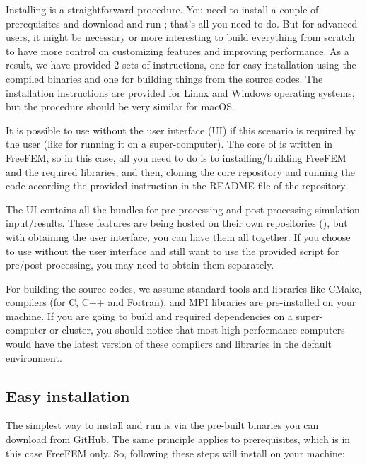 Installing \biodeg{} is a straightforward procedure. You need to install a couple of prerequisites and download and run \biodeg{}; that's all you need to do. But for advanced users, it might be necessary or more interesting to build everything from scratch to have more control on customizing features and improving performance. As a result, we have provided 2 sets of instructions, one for easy installation using the compiled binaries and one for building things from the source codes. The installation instructions are provided for Linux and Windows operating systems, but the procedure should be very similar for macOS. 

It is possible to use \biodeg{} without the user interface (UI) if this scenario is required by the user (like for running it on a super-computer). The core of \biodeg{} is written in FreeFEM, so in this case, all you need to do is to installing/building FreeFEM and the required libraries, and then, cloning the \href{https://github.com/mbarzegary/BioDeg}{\biodeg{} core repository} and running the code according the provided instruction in the README file of the repository.

The \biodeg{} UI contains all the bundles for pre-processing and post-processing simulation input/results. These features are being hosted on their own repositories (), but with obtaining the user interface, you can have them all together. If you choose to use \biodeg{} without the user interface and still want to use the provided script for pre/post-processing, you may need to obtain them separately.

For building the source codes, we assume standard tools and libraries like CMake, compilers (for C, C++ and Fortran), and MPI libraries are pre-installed on your machine. If you are going to build \biodeg{} and required dependencies on a super-computer or cluster, you should notice that most high-performance computers would have the latest version of these compilers and libraries in the default environment.

\subsection{Easy installation}

The simplest way to install and run \biodeg{} is via the pre-built binaries you can download from GitHub. The same principle applies to prerequisites, which is in this case FreeFEM only. So, following these steps will install \biodeg{} on your machine:

